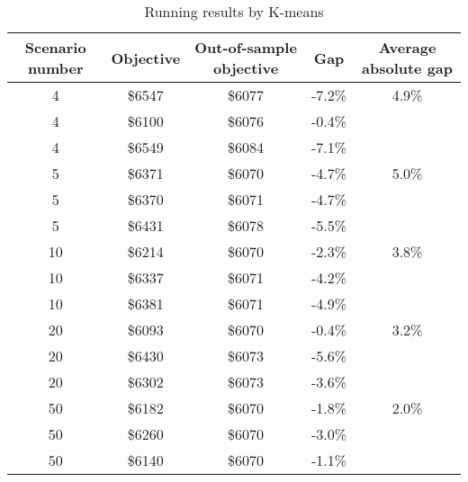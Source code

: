 \begin{table}[h]
    \centering
    \begin{tabular}{|c|c|c|c|c|}
    \hline
      \textbf{Scenario number}   & \textbf{Objective}  & \textbf{Out-of-sample objective} &\textbf{Gap}&\textbf{Average absolute gap}\\
         \hline
     4   & \$6547& \$6077 & -7.2\% &4.9\%\\\hline
     4   & \$6100& \$6076 & -0.4\%& \\\hline
          4   & \$6549& \$6084 & -7.1\%& \\\hline
      5    & \$6371& \$6070 & -4.7\% &5.0\% \\\hline
           5    & \$6370& \$6071 & -4.7\% & \\\hline
                5    & \$6431& \$6078 & -5.5\% &\\\hline
       10    & \$6214& \$6070 & -2.3\%&3.8\% \\\hline
        10    & \$6337& \$6071 & -4.2\%& \\\hline
         10    & \$6381& \$6071 & -4.9\% &\\\hline
            20   & \$6093& \$6070 & -0.4\% &3.2\%\\\hline
             20   & \$6430& \$6073 & -5.6\% &\\\hline
               20   & \$6302& \$6073 & -3.6\%& \\\hline
      50  & \$6182& \$6070 & -1.8\%&2.0\% \\\hline
       50  & \$6260& \$6070 & -3.0\% &\\\hline
        50  & \$6140& \$6070 & -1.1\% &\\\hline
    \end{tabular}
    \caption{Running results by K-means}
    \label{tab:stochaKmeans}
\end{table}